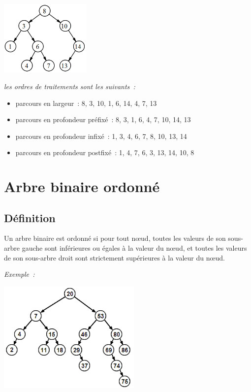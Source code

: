		\begin{center}
		\includegraphics[width=4.457cm,height=3.687cm]{image/a2012Logique2eme-img034.png}
		\end{center}
		
		{\itshape
		les ordres de traitements sont les suivants~:
		
		\begin{itemize}
			\item {
				parcours en largeur~: 8, 3, 10, 1, 6, 14, 4, 7, 13}
			\item {
				parcours en profondeur préfixé~: 8, 3, 1, 6, 4, 7, 10, 14, 13}
			\item {
				parcours en profondeur infixé~: 1, 3, 4, 6, 7, 8, 10, 13, 14}
			\item {
				parcours en profondeur postfixé~: 1, 4, 7, 6, 3, 13, 14, 10, 8}
		\end{itemize}
		}
		
		
\section{Arbre binaire ordonné}

	\subsection{Définition}

	Un arbre binaire est ordonné si pour tout n{\oe}ud, toutes les valeurs 
	de son sous-arbre gauche sont inférieures ou égales à la valeur 
	du n{\oe}ud, et toutes les valeurs de son sous-arbre droit sont 
	strictement supérieures à la valeur du n{\oe}ud.

	{\itshape Exemple~:}

	\begin{center}
	\includegraphics[width=6.994cm,height=5.486cm]{image/a2012Logique2eme-img035.png}
	\end{center}
	
